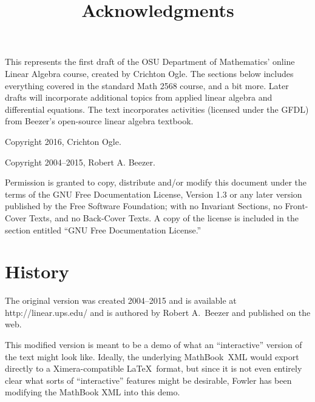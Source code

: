 \documentclass{ximera}
\title{Acknowledgments}
\begin{document}
\maketitle

This represents the first draft of the OSU Department of Mathematics'
online Linear Algebra course, created by Crichton Ogle. The sections
below includes everything covered in the standard Math 2568 course,
and a bit more. Later drafts will incorporate additional topics from
applied linear algebra and differential equations.  The text
incorporates activities (licensed under the GFDL) from Beezer's
open-source linear algebra textbook.

Copyright 2016, Crichton Ogle.

Copyright 2004--2015, Robert A. Beezer.

Permission is granted to copy, distribute and/or modify this document
under the terms of the GNU Free Documentation License, Version 1.3 or
any later version published by the Free Software Foundation; with no
Invariant Sections, no Front-Cover Texts, and no Back-Cover Texts.  A
copy of the license is included in the section entitled ``GNU Free
Documentation License.''

\section{History}   

The original version was created 2004--2015 and is available at
http://linear.ups.edu/ and is authored by Robert A.~Beezer and
published on the web.

This modified version is meant to be a demo of what an ``interactive''
version of the text might look like.  Ideally, the underlying
MathBook~XML would export directly to a Ximera-compatible \LaTeX\
format, but since it is not even entirely clear what sorts of
``interactive'' features might be desirable, Fowler has been modifying
the MathBook XML into this demo.
\end{document}
